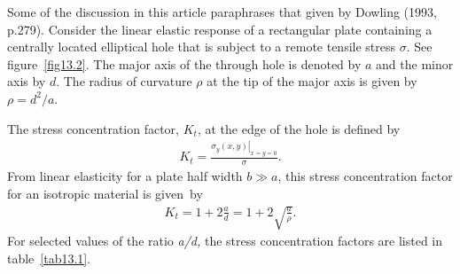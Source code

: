 \documentclass{AeroStructure-ERJohnson}
\begin{document}
Some of the discussion in this article paraphrases that given by Dowling (1993, p.279). Consider the linear elastic response of a rectangular plate containing a centrally located elliptical hole that is subject to a remote tensile stress $\sigma$. See figure~\ref{fig13.2}. The major axis of the through hole is denoted by $a$ and the minor axis by $d$. The radius of curvature $\rho$ at the tip of the major axis is given by $\rho=d^{2}/a$.


The stress concentration factor, $K_{t}$, at the edge of the hole is defined by
\begin{align}\label{eq13.1}
K_{t}=\frac{\left.\sigma_{y}(x, y)\right|_{x=y=0}}{\sigma}.
\end{align}
From linear elasticity for a plate half width $b \gg a$, this stress concentration factor for an isotropic material is given~by
\begin{align}\label{eq13.2}
K_{t}=1+2 \frac{a}{d}=1+2 \sqrt{\frac{a}{\rho}}.
\end{align}
For selected values of the ratio \textit{a/d, }the stress concentration factors are listed in table~\ref{tab13.1}.

\begin{table}
\vspace*{-1pc}
\end{table}
\end{document}
